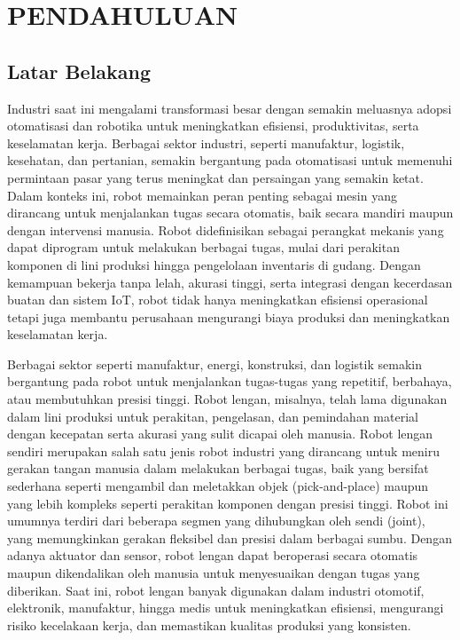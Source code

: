 \chapter{PENDAHULUAN}

\section{Latar Belakang}

Industri saat ini mengalami transformasi besar dengan semakin meluasnya adopsi otomatisasi
dan robotika untuk meningkatkan efisiensi, produktivitas, serta keselamatan kerja\parencite{Miftachul_podrded}.
Berbagai sektor industri, seperti manufaktur, logistik, kesehatan, dan pertanian, semakin bergantung pada otomatisasi
untuk memenuhi permintaan pasar yang terus meningkat dan persaingan yang semakin ketat.
Dalam konteks ini, robot memainkan peran penting sebagai mesin yang dirancang untuk
menjalankan tugas secara otomatis, baik secara mandiri maupun dengan intervensi manusia.
Robot didefinisikan sebagai perangkat mekanis yang dapat diprogram untuk melakukan berbagai tugas,
mulai dari perakitan komponen di lini produksi hingga pengelolaan inventaris di gudang.
Dengan kemampuan bekerja tanpa lelah, akurasi tinggi, serta integrasi dengan kecerdasan buatan
dan sistem IoT, robot tidak hanya meningkatkan efisiensi operasional tetapi juga
membantu perusahaan mengurangi biaya produksi dan meningkatkan keselamatan kerja.

Berbagai sektor seperti manufaktur, energi, konstruksi, dan logistik semakin bergantung pada robot
untuk menjalankan tugas-tugas yang repetitif, berbahaya, atau membutuhkan presisi tinggi\parencite{WenhuaYuan_rotifiraotsocimgvc}.
Robot lengan, misalnya, telah lama digunakan dalam lini produksi untuk perakitan, pengelasan,
dan pemindahan material dengan kecepatan serta akurasi yang sulit dicapai oleh manusia.
Robot lengan sendiri merupakan salah satu jenis robot industri yang dirancang untuk
meniru gerakan tangan manusia dalam melakukan berbagai tugas, baik yang bersifat sederhana
seperti mengambil dan meletakkan objek (pick-and-place) maupun yang lebih kompleks
seperti perakitan komponen dengan presisi tinggi. Robot ini umumnya terdiri dari beberapa segmen
yang dihubungkan oleh sendi (joint), yang memungkinkan gerakan fleksibel dan presisi dalam berbagai sumbu.
Dengan adanya aktuator dan sensor, robot lengan dapat beroperasi secara otomatis maupun dikendalikan
oleh manusia untuk menyesuaikan dengan tugas yang diberikan. Saat ini, robot lengan banyak digunakan
dalam industri otomotif, elektronik, manufaktur, hingga medis untuk meningkatkan efisiensi,
mengurangi risiko kecelakaan kerja, dan memastikan kualitas produksi yang konsisten.

